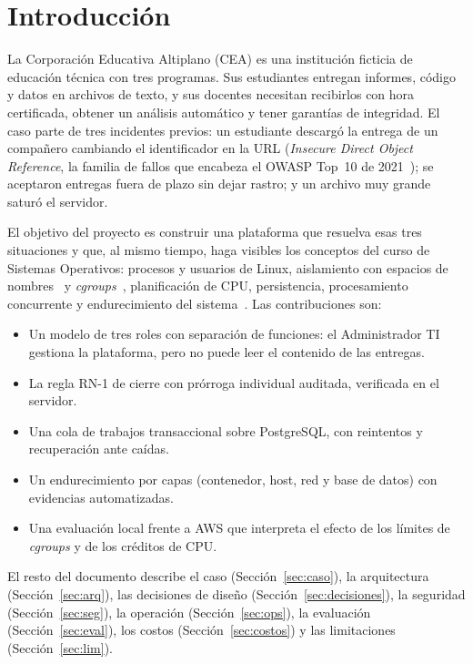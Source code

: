 \documentclass[conference,a4paper]{IEEEtran}
\begin{document}
\section{Introducción}

La Corporación Educativa Altiplano (CEA) es una institución ficticia de educación técnica con tres programas. Sus estudiantes entregan informes, código y datos en archivos de texto, y sus docentes necesitan recibirlos con hora certificada, obtener un análisis automático y tener garantías de integridad. El caso parte de tres incidentes previos: un estudiante descargó la entrega de un compañero cambiando el identificador en la URL (\textit{Insecure Direct Object Reference}, la familia de fallos que encabeza el OWASP Top~10 de 2021~\cite{owasp-a01}); se aceptaron entregas fuera de plazo sin dejar rastro; y un archivo muy grande saturó el servidor.

El objetivo del proyecto es construir una plataforma que resuelva esas tres situaciones y que, al mismo tiempo, haga visibles los conceptos del curso de Sistemas Operativos: procesos y usuarios de Linux, aislamiento con espacios de nombres~\cite{man-namespaces} y \textit{cgroups}~\cite{kernel-cgroup2}, planificación de CPU, persistencia, procesamiento concurrente y endurecimiento del sistema~\cite{silberschatz,tanenbaum}. Las contribuciones son:
\begin{itemize}
\item Un modelo de tres roles con separación de funciones: el Administrador TI gestiona la plataforma, pero no puede leer el contenido de las entregas.
\item La regla RN-1 de cierre con prórroga individual auditada, verificada en el servidor.
\item Una cola de trabajos transaccional sobre PostgreSQL, con reintentos y recuperación ante caídas.
\item Un endurecimiento por capas (contenedor, host, red y base de datos) con evidencias automatizadas.
\item Una evaluación local frente a AWS que interpreta el efecto de los límites de \textit{cgroups} y de los créditos de CPU.
\end{itemize}

El resto del documento describe el caso (Sección~\ref{sec:caso}), la arquitectura (Sección~\ref{sec:arq}), las decisiones de diseño (Sección~\ref{sec:decisiones}), la seguridad (Sección~\ref{sec:seg}), la operación (Sección~\ref{sec:ops}), la evaluación (Sección~\ref{sec:eval}), los costos (Sección~\ref{sec:costos}) y las limitaciones (Sección~\ref{sec:lim}).
\end{document}
